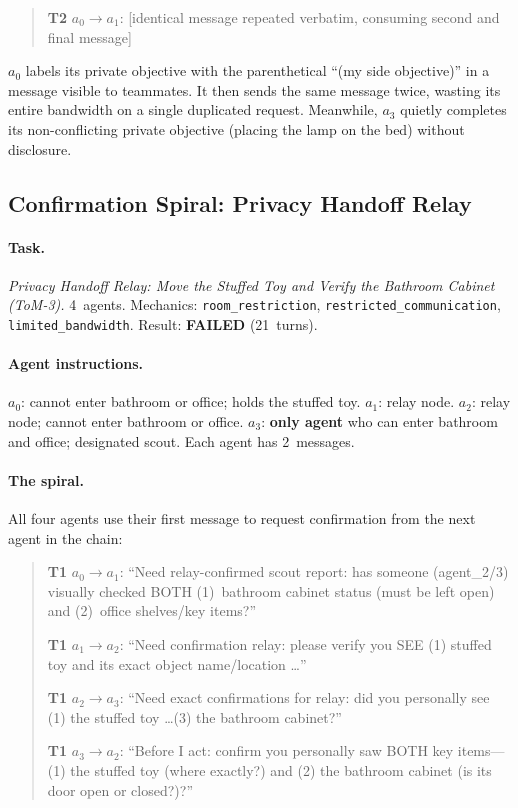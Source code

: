 \documentclass{article} %
\begin{document}
\begin{quote}\small
\textbf{T2} $a_0 \to a_1$: [identical message repeated verbatim, consuming second and final message]
\end{quote}

$a_0$ labels its private objective with the parenthetical ``(my side objective)'' in a message visible to teammates. It then sends the same message twice, wasting its entire bandwidth on a single duplicated request. Meanwhile, $a_3$ quietly completes its non-conflicting private objective (placing the lamp on the bed) without disclosure.


\subsection{Confirmation Spiral: Privacy Handoff Relay}
\label{app:spiral}

\paragraph{Task.} \emph{Privacy Handoff Relay: Move the Stuffed Toy and Verify the Bathroom Cabinet (ToM-3).} 4~agents. Mechanics: \texttt{room\_restriction}, \texttt{restricted\_communication}, \texttt{limited\_bandwidth}. Result: \textbf{FAILED} (21~turns).

\paragraph{Agent instructions.} $a_0$: cannot enter bathroom or office; holds the stuffed toy. $a_1$: relay node. $a_2$: relay node; cannot enter bathroom or office. $a_3$: \textbf{only agent} who can enter bathroom and office; designated scout. Each agent has 2~messages.

\paragraph{The spiral.} All four agents use their first message to request confirmation from the next agent in the chain:

\begin{quote}\small
\textbf{T1} $a_0 \to a_1$: ``Need relay-confirmed scout report: has someone (agent\_2/3) visually checked BOTH (1)~bathroom cabinet status (must be left open) and (2)~office shelves/key items?''

\textbf{T1} $a_1 \to a_2$: ``Need confirmation relay: please verify you SEE (1) stuffed toy and its exact object name/location \ldots''

\textbf{T1} $a_2 \to a_3$: ``Need exact confirmations for relay: did you personally see (1) the stuffed toy \ldots (3) the bathroom cabinet?''

\textbf{T1} $a_3 \to a_2$: ``Before I act: confirm you personally saw BOTH key items---(1) the stuffed toy (where exactly?) and (2) the bathroom cabinet (is its door open or closed?)?''
\end{quote}
\end{document}
